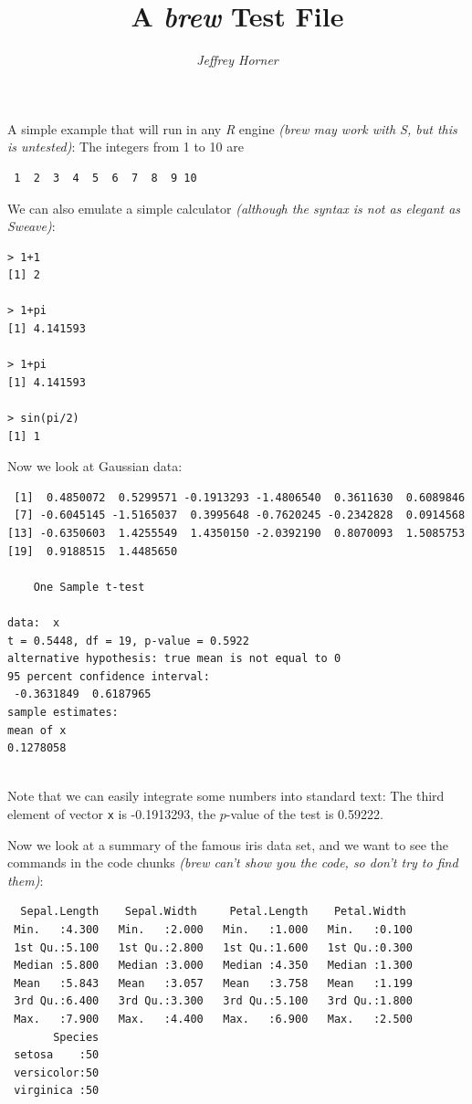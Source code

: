 \documentclass[a4paper]{article}
\title{A \emph{brew} Test File}
\author{\emph{Jeffrey Horner}}
\begin{document}
\maketitle

A simple example that will run in any \emph{R} engine \emph{(brew may work with S, but this is untested)}: The integers from 1 to
10 are
\begin{verbatim}
 1  2  3  4  5  6  7  8  9 10
\end{verbatim}

We can also emulate a simple calculator \emph{(although the syntax is not as elegant as Sweave)}:
\begin{verbatim}
> 1+1
[1] 2

> 1+pi
[1] 4.141593

> 1+pi
[1] 4.141593

> sin(pi/2)
[1] 1

\end{verbatim}

Now we look at Gaussian data:

\begin{verbatim}
 [1]  0.4850072  0.5299571 -0.1913293 -1.4806540  0.3611630  0.6089846
 [7] -0.6045145 -1.5165037  0.3995648 -0.7620245 -0.2342828  0.0914568
[13] -0.6350603  1.4255549  1.4350150 -2.0392190  0.8070093  1.5085753
[19]  0.9188515  1.4485650

	One Sample t-test

data:  x 
t = 0.5448, df = 19, p-value = 0.5922
alternative hypothesis: true mean is not equal to 0 
95 percent confidence interval:
 -0.3631849  0.6187965 
sample estimates:
mean of x 
0.1278058 


\end{verbatim}

Note that we can easily integrate some numbers into standard text: The
third element of vector \texttt{x} is -0.1913293, the
$p$-value of the test is 0.59222. %

Now we look at a summary of the famous iris data set, and we want to
see the commands in the code chunks \emph{(brew can't show you the code, so
don't try to find them)}:

\begin{verbatim}
  Sepal.Length    Sepal.Width     Petal.Length    Petal.Width   
 Min.   :4.300   Min.   :2.000   Min.   :1.000   Min.   :0.100  
 1st Qu.:5.100   1st Qu.:2.800   1st Qu.:1.600   1st Qu.:0.300  
 Median :5.800   Median :3.000   Median :4.350   Median :1.300  
 Mean   :5.843   Mean   :3.057   Mean   :3.758   Mean   :1.199  
 3rd Qu.:6.400   3rd Qu.:3.300   3rd Qu.:5.100   3rd Qu.:1.800  
 Max.   :7.900   Max.   :4.400   Max.   :6.900   Max.   :2.500  
       Species  
 setosa    :50  
 versicolor:50  
 virginica :50  
                
                
                

\end{verbatim}
\end{document}
